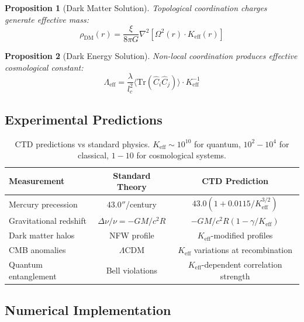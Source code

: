\documentclass[11pt,a4paper]{article}
\newtheorem{proposition}{Proposition}
\begin{document}
\begin{proposition}[Dark Matter Solution]
	Topological coordination charges generate effective mass:
	\[
	\rho_{\mathrm{DM}}(r) = \frac{\xi}{8\pi G} \nabla^2 \left[ \Omega^2(r) \cdot K_{\mathrm{eff}}(r) \right]
	\]
\end{proposition}

\begin{proposition}[Dark Energy Solution]
	Non-local coordination produces effective cosmological constant:
	\[
	\Lambda_{\mathrm{eff}} = \frac{\lambda}{l_c^2} \langle \mathrm{Tr}(\hat{C}_i\hat{C}_j) \rangle \cdot K_{\mathrm{eff}}^{-1}
	\]
\end{proposition}

\subsection{Experimental Predictions}

\begin{table}[htbp]
	\centering
	\begin{tabular}{lcc}
		\toprule
		\textbf{Measurement} & \textbf{Standard Theory} & \textbf{CTD Prediction} \\
		\midrule
		Mercury precession & $43.0''$/century & $43.0(1 + 0.0115/K_{\mathrm{eff}}^{3/2})$ \\
		Gravitational redshift & $\Delta\nu/\nu = -GM/c^2R$ & $-GM/c^2R(1 - \gamma/K_{\mathrm{eff}})$ \\
		Dark matter halos & NFW profile & $K_{\mathrm{eff}}$-modified profiles \\
		CMB anomalies & $\Lambda$CDM & $K_{\mathrm{eff}}$ variations at recombination \\
		Quantum entanglement & Bell violations & $K_{\mathrm{eff}}$-dependent correlation strength \\
		\bottomrule
	\end{tabular}
	\caption{CTD predictions vs standard physics. $K_{\mathrm{eff}} \sim 10^{10}$ for quantum, $10^2-10^4$ for classical, $1-10$ for cosmological systems.}
\end{table}

\subsection{Numerical Implementation}
\end{document}
